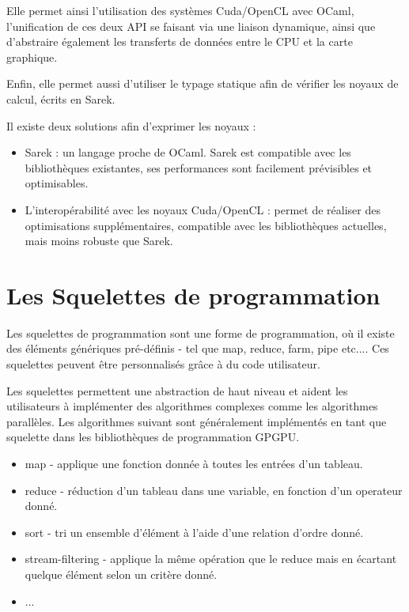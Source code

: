 \documentclass{report}
\begin{document}
Elle permet ainsi l’utilisation des systèmes Cuda/OpenCL avec OCaml, l’unification de ces deux API se faisant via une liaison dynamique, ainsi que d’abstraire également les transferts de données entre le CPU et la carte graphique.\newline

Enfin, elle permet aussi d’utiliser le typage statique afin de vérifier les noyaux de calcul, écrits en Sarek.\newline

Il existe deux solutions afin d’exprimer les noyaux :
\begin{itemize}

\item Sarek : un langage proche de OCaml. Sarek est compatible avec les bibliothèques existantes, ses performances sont facilement prévisibles et optimisables.

\item L’interopérabilité avec les noyaux Cuda/OpenCL : permet de réaliser des optimisations supplémentaires, compatible avec les bibliothèques actuelles, mais moins robuste que Sarek.


\end{itemize}


\section{Les Squelettes de programmation}
Les squelettes de programmation sont une forme de programmation, où il existe des éléments génériques pré-définis - tel que map, reduce, farm, pipe etc.... Ces squelettes peuvent être personnalisés grâce à du code utilisateur.\newline

Les squelettes permettent une abstraction de haut niveau et aident les utilisateurs à implémenter des algorithmes complexes comme les algorithmes parallèles. Les algorithmes suivant sont généralement implémentés en tant que squelette dans les bibliothèques de programmation GPGPU.

\begin{itemize}
\item map - applique une fonction donnée à toutes les entrées d’un tableau.
\item reduce - réduction d’un tableau dans une variable, en fonction d’un operateur donné.
\item sort - tri un ensemble d’élément à l’aide d’une relation d’ordre donné.
\item stream-filtering - applique la même opération que le reduce mais en écartant quelque élément selon un critère donné.
\item ...
\end{itemize}
\end{document}
